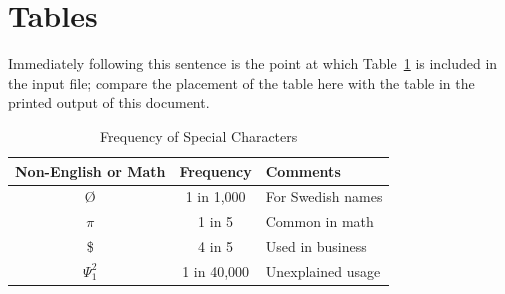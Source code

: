 \documentclass[sigconf]{acmart}
\begin{document}
\section{Tables}


Immediately following this sentence is the point at which
Table~\ref{tab:freq} is included in the input file; compare the
placement of the table here with the table in the printed output of
this document.

\begin{table}
  \caption{Frequency of Special Characters}
  \label{tab:freq}
  \begin{tabular}{ccl}
    \toprule
    Non-English or Math&Frequency&Comments\\
    \midrule
    \O & 1 in 1,000& For Swedish names\\
    $\pi$ & 1 in 5& Common in math\\
    \$ & 4 in 5 & Used in business\\
    $\Psi^2_1$ & 1 in 40,000& Unexplained usage\\
  \bottomrule
\end{tabular}
\end{table}
\end{document}
